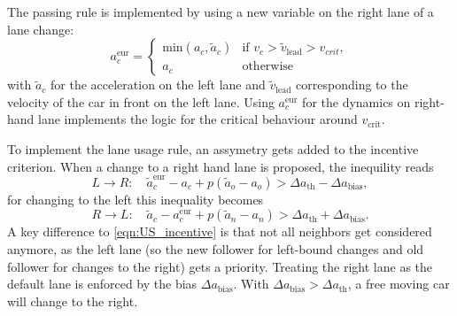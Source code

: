 The passing rule is implemented by using a new variable on the right lane of a lane change:
\begin{equation}
  a_c^\text{eur} = 
  \begin{cases}
    \text{min}(a_c, \tilde{a}_c) & \text{if } v_c > \tilde v_\text{lead} > v_{crit}, \\
    a_c                         & \text{otherwise}
  \end{cases}
\end{equation}
with $\tilde a_c$ for the acceleration on the left lane and $\tilde v_\text{lead}$ corresponding to the velocity of
the car in front on the left lane.
Using $a_c^\text{eur}$ for the dynamics on right-hand lane implements the logic for the critical behaviour around
$v_\text{crit}$.

To implement the lane usage rule, an assymetry gets added to the incentive criterion. When a change to a right hand
lane is proposed, the inequility reads
\begin{equation}
  L \rightarrow R: \quad
  \tilde a_c^\text{eur} - a_c + p (\tilde a_o - a_o) > \Delta a_\text{th} - \Delta a_\text{bias},
\end{equation}
for changing to the left this inequality becomes
\begin{equation}
  R \rightarrow L: \quad
  \tilde a_c - a_c^\text{eur} + p (\tilde a_n - a_n) > \Delta a_\text{th} + \Delta a_\text{bias}.
\end{equation}
A key difference to \autoref{eqn:US_incentive} is that not all neighbors get considered anymore, as the left lane
(so the new follower for left-bound changes and old follower for changes to the right) gets a priority. Treating
the right lane as the default lane is enforced by the bias $\Delta a_\text{bias}$. With 
$\Delta a_\text{bias} > \Delta a_\text{th}$, a free moving car will change to the right.

